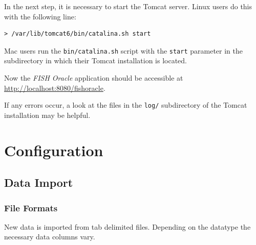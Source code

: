 \documentclass[11pt,final]{article}
\newcommand{\Gt}[0]{\emph{GenomeTools}\xspace}
\newcommand{\Gtj}[0]{\emph{GenomeTools-Java}\xspace}
\newcommand{\FO}[0]{\emph{FISH Oracle}\xspace}
\begin{document}
In the next step, it is necessary to start the Tomcat server. Linux users do
this with the following line:

\begin{lstlisting}
> /var/lib/tomcat6/bin/catalina.sh start
\end{lstlisting}

Mac users run the \texttt{bin/catalina.sh} script with the \texttt{start}
parameter in the subdirectory in which their Tomcat installation is located.

Now the \FO application should be accessible at
\url{http://localhost:8080/fishoracle}.

If any errors occur, a look at the files in the \texttt{log/} subdirectory of
the Tomcat installation may be helpful.





\section{Configuration}

\subsection{Data Import}

\subsubsection{File Formats}

New data is imported from tab delimited files. Depending on the datatype the
necessary data columns vary.
\end{document}
